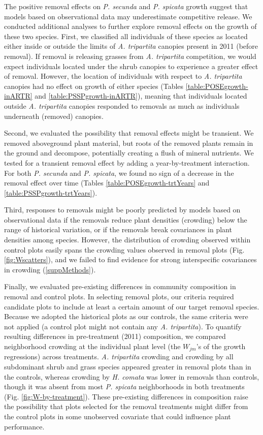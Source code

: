 \documentclass[11pt]{article}
\begin{document}
\begin{doublespacing}
The positive removal effects on \textit{P. secunda}  and \textit{P. spicata} growth suggest that models based on observational data may underestimate competitive release. We conducted additional analyses to further explore removal effects on the growth of these two species. First, we classified all individuals of these species as located either inside or outside the limits of \textit{A. tripartita} canopies present in 2011 (before removal). If removal is releasing grasses from \textit{A. tripartita} competition, we would expect individuals located under the shrub canopies to experience a greater effect of removal. However, the location of individuals with respect to \textit{A. tripartita} canopies had no effect on growth of either species (Tables \ref{table:POSEgrowth-inARTR} and \ref{table:PSSPgrowth-inARTR}), meaning that individuals located outside \textit{A. tripartita} canopies responded to removals as much as individuals underneath (removed) canopies. 

Second, we evaluated the possibility that removal effects might be transient. We removed aboveground plant material, but roots of the removed plants remain in the ground and decompose, potentially creating a flush of mineral nutrients. We tested for a transient removal effect by adding a year-by-treatment interaction. For both  \textit{P. secunda}  and \textit{P. spicata}, we found no sign of a decrease in the removal effect over time (Tables \ref{table:POSEgrowth-trtYears} and \ref{table:PSSPgrowth-trtYears}).

Third, responses to removals might be poorly predicted by models based on observational data if the removals reduce plant densities (crowding) below the range of historical variation, or if the removals break covariances in plant densities among species. However, the distribution of crowding observed within control plots easily spans the crowding values observed in removal plots (Fig. \ref{fig:Wscatters}), and we failed to find evidence for strong interspecific covariances in crowding (\ref{suppMethods}).

Finally, we evaluated pre-existing differences in community composition in removal and control plots. In selecting removal plots, our criteria required candidate plots to include at least a certain amount of our target removal species. Because we adopted the historical plots as our controls, the same criteria were not applied (a control plot might not contain any \textit{A. tripartita}). To quantify resulting differences in pre-treatment (2011) composition, we compared neighborhood crowding at the individual plant level (the $W_{jm}$'s of the growth regressions) across treatments. \textit{A. tripartita} crowding and crowding by all subdominant shrub and grass species appeared greater in removal plots than in the controls, whereas crowding by \textit{H. comata} was lower in removals than controls, though it was absent from most \textit{P. spicata} neighborhoods in both treatments (Fig. \ref{fig:W-by-treatment}). These pre-existing differences in composition raise the possibility that plots selected for the removal treatments might differ from the control plots in some unobserved covariate that could influence plant performance.


\end{doublespacing}
\end{document}
